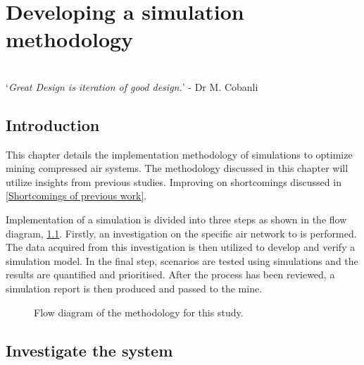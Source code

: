 \chapter{Developing a simulation methodology}
\thispagestyle{empty}
\vspace{38em}
\hrulefill
\\
\enquote*{\textit{Great Design is iteration of good design.}} - Dr M. Cobanli\\
\newpage
\section{Introduction}
This chapter details the implementation methodology of simulations to optimize mining compressed air systems. The methodology discussed in this chapter will utilize insights from previous studies. Improving on shortcomings discussed in \cref{Shortcomings of previous work}.
\par 
Implementation of a simulation is divided into three steps as shown in the flow diagram, \cref{fig: Methodology}. Firstly, an investigation on the specific air network to is performed. The data acquired from this investigation is then utilized to develop and verify a simulation model. In the final step, scenarios are tested using simulations and the results are quantified and prioritised. After the process has been reviewed, a simulation  report is then produced and passed to the mine.
\begin{figure}[h]
	\centering
	\caption{Flow diagram of the methodology for this study.}
	\label{fig: Methodology}
\end{figure}
\section{Investigate the system}
